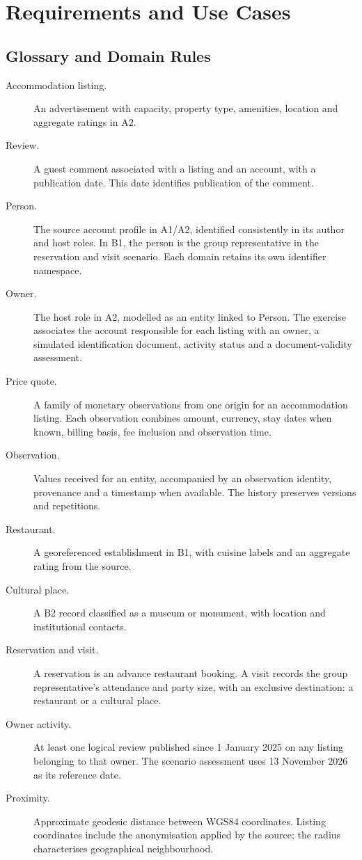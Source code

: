 \section{Requirements and Use Cases}
\label{sec:requisitos}
\subsection{Glossary and Domain Rules}
\begin{description}
\item[Accommodation listing.] An advertisement with capacity, property type, amenities, location and aggregate ratings in A2.
\item[Review.] A guest comment associated with a listing and an account, with a publication date. This date identifies publication of the comment.
\item[Person.] The source account profile in A1/A2, identified consistently in its author and host roles. In B1, the person is the group representative in the reservation and visit scenario. Each domain retains its own identifier namespace.
\item[Owner.] The host role in A2, modelled as an entity linked to Person. The exercise associates the account responsible for each listing with an owner, a simulated identification document, activity status and a document-validity assessment.
\item[Price quote.] A family of monetary observations from one origin for an accommodation listing. Each observation combines amount, currency, stay dates when known, billing basis, fee inclusion and observation time.
\item[Observation.] Values received for an entity, accompanied by an observation identity, provenance and a timestamp when available. The history preserves versions and repetitions.
\item[Restaurant.] A georeferenced establishment in B1, with cuisine labels and an aggregate rating from the source.
\item[Cultural place.] A B2 record classified as a museum or monument, with location and institutional contacts.
\item[Reservation and visit.] A reservation is an advance restaurant booking. A visit records the group representative's attendance and party size, with an exclusive destination: a restaurant or a cultural place.
\item[Owner activity.] At least one logical review published since 1 January 2025 on any listing belonging to that owner. The scenario assessment uses 13 November 2026 as its reference date.
\item[Proximity.] Approximate geodesic distance between WGS84 coordinates. Listing coordinates include the anonymisation applied by the source; the radius characterises geographical neighbourhood.
\end{description}

